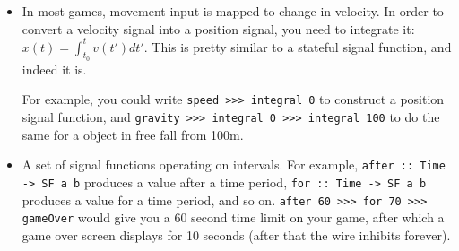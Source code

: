 \documentclass[pdftex,a4paper]{extarticle}
\begin{document}
\begin{itemize}
\item In most games, movement input is mapped to change in velocity. In order to convert a velocity signal into a position signal, you need to integrate it: $x(t) = \int_{t_0}^t v(t') dt'$. This is pretty similar to a stateful signal function, and indeed it is. 
\begin{figure}[ht]
\centering
{}
\end{figure}
For example, you could write \texttt{speed >>> integral 0} to construct a position signal function, and \texttt{gravity >>> integral 0 >>> integral 100} to do the same for a object in free fall from 100m.

\item A set of signal functions operating on intervals\cite{netwire-interval}. For example, \texttt{after :: Time -> SF a b} produces a value after a time period, \texttt{for :: Time -> SF a b} produces a value for a time period, and so on. \texttt{after 60 >>> for 70 >>> gameOver} would give you a 60 second time limit on your game, after which a game over screen displays for 10 seconds (after that the wire inhibits forever).


\end{itemize}
\end{document}
